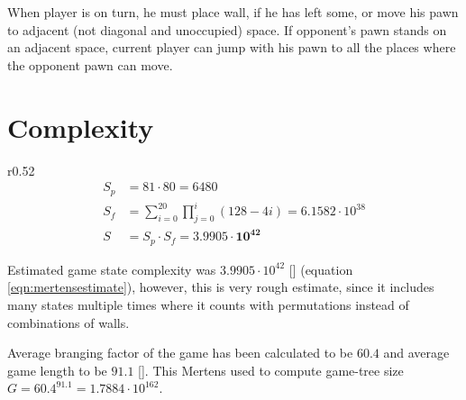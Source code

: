 When player is on turn, he must place wall, if he has left some, or move
his pawn to adjacent (not diagonal and unoccupied) space.
If opponent's pawn stands on an adjacent space, current player can jump
with his pawn to all the places where the opponent pawn can move.

\section{Complexity}
\begin{wrapfigure}{r}{0.52\textwidth}
  \vspace*{-2.35cm}
  \begin{equation}
    \label{eqn:mertensestimate}
    \begin{aligned}
      S_p\!&=\!81 \cdot 80 = 6480 \\
      S_f\!&=\!\sum_{i=0}^{20}\prod_{j=0}^{i}(128 - 4i)\!=\!6.1582{\cdot}10^{38} \\
      S\!&=\!S_p \cdot S_f = \mathbf{3.9905 \cdot 10 ^{42}}
    \end{aligned}
  \end{equation}
  \vspace*{-1.25cm}
\end{wrapfigure}

Estimated game state complexity was $3.9905\cdot10^{42}$
[\cite{mertens}] (equation \ref{eqn:mertensestimate}), however, this is very rough estimate, since
it includes many states multiple times where it counts with permutations
instead of combinations of walls.

Average branging factor of the game has been calculated to be $60.4$ and
average game length to be $91.1$ [\cite{glendenning}]. This Mertens used to
compute game-tree size $G = 60.4^{91.1} = 1.7884{\cdot}10^{162}$.


